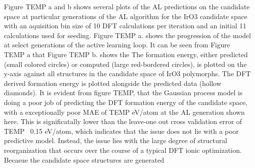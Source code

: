 %
Figure TEMP a and b shows several plots of the AL predictions on the candidate space at particular generations of the AL algorithm for the IrO3 candidate space with an aquisition bin size of 10 DFT calculations per iteration and an initial 11 calculations used for seeding.
%
Figure TEMP a. shows the progression of the model at select generations of the active learning loop.
%
It can be seen from Figure TEMP a that
%
Figure TEMP b. shows the
The formation energy, either predicted (small colored circles) or computed (large red-bordered circles), is plotted on the y-axis against all structures in the candidate space of IrO3 polymorphs.
%
The DFT derived formation energy is plotted alongside the predicted data (hollow diamonds).
%
It is evident from figure TEMP, that the Gaussian process model is doing a poor job of predicting the DFT formation energy of the candidate space, with a exceptionally poor MAE of TEMP eV/atom at the AL generation shown here.
%
This is significatally lower than the leave-one out cross validation error of TEMP ~0.15 eV/atom, which indicates that the issue does not lie with a poor predictive model.
%
Instead, the issue lies with the large degree of structural reorganization that occurs over the course of a typical DFT ionic optimization.
Becasue the candidate space structures are generated


